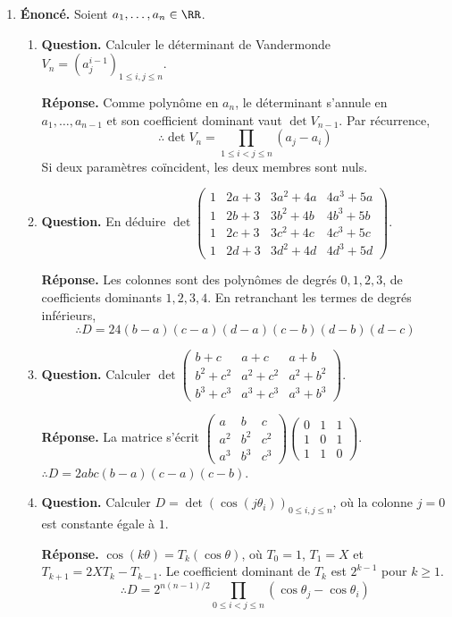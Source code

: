 \documentclass[12pt, a4paper]{article}
\begin{document}
\begin{enumerate}[label=5.\arabic*., start=54]
  \item \begin{minipage}[t]{\linewidth}\raggedright
\textbf{Énoncé.} Soient $a_1,\ldots,a_n\in\RR$.

\begin{enumerate}[\arabic*.]
        \item \textbf{Question.} Calculer le déterminant de Vandermonde $V_n=(a_j^{i-1})_{1\leq i,j\leq n}$.
\par\smallskip
\textbf{Réponse.} Comme polynôme en $a_n$, le déterminant s'annule en $a_1,\ldots,a_{n-1}$ et son coefficient dominant vaut $\det V_{n-1}$.
        Par récurrence,
        \[
          \therefore\det V_n=\prod_{1\leq i<j\leq n}(a_j-a_i)
        \]
        Si deux paramètres coïncident, les deux membres sont nuls.

  \item \textbf{Question.} En déduire $\displaystyle\det\begin{pmatrix}1&2a+3&3a^2+4a&4a^3+5a\\1&2b+3&3b^2+4b&4b^3+5b\\1&2c+3&3c^2+4c&4c^3+5c\\1&2d+3&3d^2+4d&4d^3+5d\end{pmatrix}$.
\par\smallskip
\textbf{Réponse.} Les colonnes sont des polynômes de degrés $0,1,2,3$, de coefficients dominants $1,2,3,4$.
        En retranchant les termes de degrés inférieurs,
        \[
          \therefore D=24(b-a)(c-a)(d-a)(c-b)(d-b)(d-c)
        \]

  \item \textbf{Question.} Calculer $\displaystyle\det\begin{pmatrix}b+c&a+c&a+b\\b^2+c^2&a^2+c^2&a^2+b^2\\b^3+c^3&a^3+c^3&a^3+b^3\end{pmatrix}$.
\par\smallskip
\textbf{Réponse.} La matrice s'écrit
        $\displaystyle\begin{pmatrix}a&b&c\\a^2&b^2&c^2\\a^3&b^3&c^3\end{pmatrix}
          \begin{pmatrix}0&1&1\\1&0&1\\1&1&0\end{pmatrix}$.
        $\therefore D=2abc(b-a)(c-a)(c-b)$.

  \item \textbf{Question.} Calculer $D=\det(\cos(j\theta_i))_{0\leq i,j\leq n}$, où la colonne $j=0$ est constante égale à $1$.
\par\smallskip
\textbf{Réponse.} $\cos(k\theta)=T_k(\cos\theta)$, où $T_0=1$, $T_1=X$ et $T_{k+1}=2XT_k-T_{k-1}$.
        Le coefficient dominant de $T_k$ est $2^{k-1}$ pour $k\geq1$.
        \[
          \therefore D=2^{n(n-1)/2}\prod_{0\leq i<j\leq n}(\cos\theta_j-\cos\theta_i)
        \]


\end{enumerate}
\end{minipage}
\end{enumerate}
\end{document}
